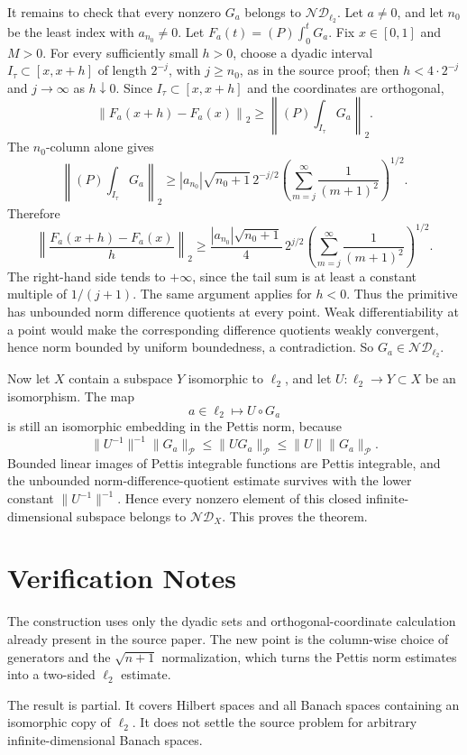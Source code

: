 \documentclass[11pt]{article}
\newcommand{\Pettis}{\mathcal P}
\newcommand{\ND}{\mathcal{ND}}
\begin{document}
It remains to check that every nonzero \(G_a\) belongs to \(\ND_{\ell_2}\).
Let \(a\ne0\), and let \(n_0\) be the least index with \(a_{n_0}\ne0\).  Let
\(F_a(t)=(P)\int_0^t G_a\).  Fix \(x\in[0,1]\) and \(M>0\).  For every
sufficiently small \(h>0\), choose a dyadic interval \(I_\tau\subset[x,x+h]\)
of length \(2^{-j}\), with \(j\ge n_0\), as in the source proof; then
\(h<4\cdot 2^{-j}\) and \(j\to\infty\) as \(h\downarrow0\).  Since
\(I_\tau\subset[x,x+h]\) and the coordinates are orthogonal,
\[
\left\|F_a(x+h)-F_a(x)\right\|_2
\ge
\left\|(P)\int_{I_\tau}G_a\right\|_2.
\]
The \(n_0\)-column alone gives
\[
\left\|(P)\int_{I_\tau}G_a\right\|_2
\ge
|a_{n_0}|\sqrt{n_0+1}\,
2^{-j/2}
\left(\sum_{m=j}^{\infty}\frac1{(m+1)^2}\right)^{1/2}.
\]
Therefore
\[
\left\|\frac{F_a(x+h)-F_a(x)}{h}\right\|_2
\ge
\frac{|a_{n_0}|\sqrt{n_0+1}}{4}\,
2^{j/2}
\left(\sum_{m=j}^{\infty}\frac1{(m+1)^2}\right)^{1/2}.
\]
The right-hand side tends to \(+\infty\), since the tail sum is at least a
constant multiple of \(1/(j+1)\).  The same argument applies for \(h<0\).
Thus the primitive has unbounded norm difference quotients at every point.
Weak differentiability at a point would make the corresponding difference
quotients weakly convergent, hence norm bounded by uniform boundedness, a
contradiction.  So \(G_a\in\ND_{\ell_2}\).

Now let \(X\) contain a subspace \(Y\) isomorphic to \(\ell_2\), and let
\(U\colon\ell_2\to Y\subset X\) be an isomorphism.  The map
\[
a\in\ell_2\longmapsto U\circ G_a
\]
is still an isomorphic embedding in the Pettis norm, because
\[
\|U^{-1}\|^{-1}\|G_a\|_{\Pettis}
\le
\|U G_a\|_{\Pettis}
\le
\|U\|\|G_a\|_{\Pettis}.
\]
Bounded linear images of Pettis integrable functions are Pettis integrable,
and the unbounded norm-difference-quotient estimate survives with the lower
constant \(\|U^{-1}\|^{-1}\).  Hence every nonzero element of this closed
infinite-dimensional subspace belongs to \(\ND_X\).  This proves the theorem.

\section*{Verification Notes}

The construction uses only the dyadic sets and orthogonal-coordinate
calculation already present in the source paper.  The new point is the
column-wise choice of generators and the \(\sqrt{n+1}\) normalization, which
turns the Pettis norm estimates into a two-sided \(\ell_2\) estimate.

The result is partial.  It covers Hilbert spaces and all Banach spaces
containing an isomorphic copy of \(\ell_2\).  It does not settle the source
problem for arbitrary infinite-dimensional Banach spaces.
\end{document}
